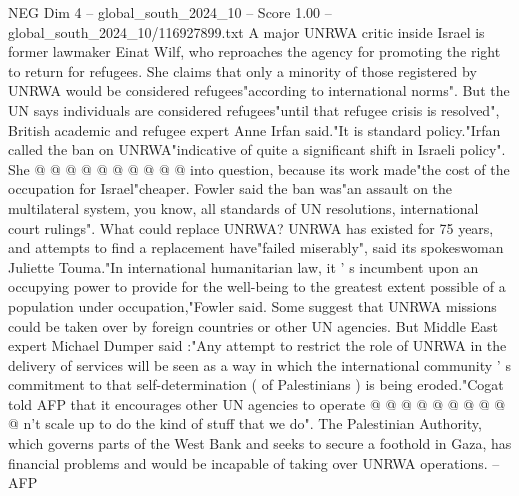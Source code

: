 \begin{textsample}{NEG Dim 4 – global\_south\_2024\_10 – Score 1.00 – global\_south\_2024\_10/116927899.txt}
A major UNRWA critic inside Israel is former lawmaker Einat Wilf, who reproaches the agency for promoting the right to return for refugees.
She claims that only a minority of those registered by UNRWA would be considered refugees"according to international norms".
But the UN says individuals are considered refugees"until that refugee crisis is resolved", British academic and refugee expert Anne Irfan said."It is standard policy."Irfan called the ban on UNRWA"indicative of quite a significant shift in Israeli policy".
She @ @ @ @ @ @ @ @ @ @ into question, because its work made"the cost of the occupation for Israel"cheaper.
Fowler said the ban was"an assault on the multilateral system, you know, all standards of UN resolutions, international court rulings".
What could replace UNRWA?
UNRWA has existed for 75 years, and attempts to find a replacement have"failed miserably", said its spokeswoman Juliette Touma."In international humanitarian law, it ' s incumbent upon an occupying power to provide for the well-being to the greatest extent possible of a population under occupation,"Fowler said.
Some suggest that UNRWA missions could be taken over by foreign countries or other UN agencies.
But Middle East expert Michael Dumper said :"Any attempt to restrict the role of UNRWA in the delivery of services will be seen as a way in which the international community ' s commitment to that self-determination ( of Palestinians ) is being eroded."Cogat told AFP that it encourages other UN agencies to operate @ @ @ @ @ @ @ @ @ @ n't scale up to do the kind of stuff that we do".
The Palestinian Authority, which governs parts of the West Bank and seeks to secure a foothold in Gaza, has financial problems and would be incapable of taking over UNRWA operations. -- AFP

\end{textsample}
